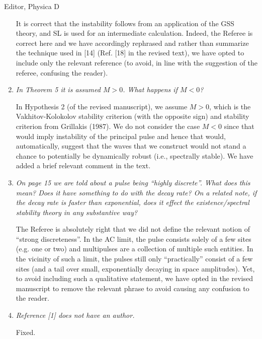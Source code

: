 \documentclass[11pt]{letter}
\begin{document}
\begin{letter}{Editor, Physica D}
\begin{enumerate}
\vspace{4mm}
It is correct that the instability follows from an application of the GSS theory, and SL is used for an intermediate calculation. 
Indeed, the Referee is correct here and we have accordingly
rephrased and rather than summarize the technique used in [14] (Ref. [18]
in the revised text), we have opted to include only the 
relevant reference (to avoid, in line with the suggestion
of the referee, confusing the reader).
\vspace{4mm}

\item \emph{In Theorem 5 it is assumed $M > 0$. What happens if $M < 0$?}

\vspace{4mm}
In Hypothesis 2 (of the revised manuscript), we assume $M > 0$, which is the Vakhitov-Kolokolov stability criterion (with the opposite sign) and stability criterion from Grillakis (1987). We do not consider the case $M < 0$ since that would imply instability of the principal pulse and hence that would, automatically, 
suggest that the waves that we construct would not stand a
chance to potentially be dynamically robust (i.e., spectrally stable).
We have added a brief relevant comment in the text.
\vspace{4mm}

\item \emph{On page 15 we are told about a pulse being ``highly discrete''. What does this mean? Does it have something to do with the decay rate? On a related note, if the decay rate is faster than exponential, does it effect the existence/spectral stability theory in any substantive way?}

\vspace{4mm}
The Referee is absolutely right that we did not define the
relevant notion of ``strong discreteness''.  In the AC limit, the pulse consists solely of a few sites (e.g. one or two) and multipulses
are a collection of multiple such entities. 
In the vicinity of such a limit, the pulses still only
``practically'' consist of a few sites (and a 
tail over small, exponentially decaying in space amplitudes).
Yet, to avoid including such a qualitative statement,
we have opted in the revised manuscript to remove 
the relevant phrase to avoid causing any confusion to the reader.
\vspace{4mm}

\item \emph{Reference [1] does not have an author.}

\vspace{4mm}
Fixed.
\vspace{4mm}


\end{enumerate}
\end{letter}
\end{document}
